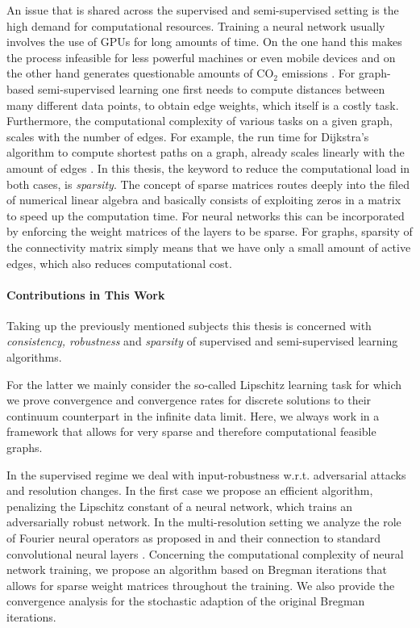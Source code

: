 An issue that is shared across the supervised and semi-supervised setting is the high demand for computational resources. Training a neural network usually involves the use of GPUs for long amounts of time. On the one hand this makes the process infeasible for less powerful machines or even mobile devices and on the other hand generates questionable amounts of $\mathrm{CO_2}$ emissions \cite{hoefler2021sparsity}. For graph-based semi-supervised learning one first needs to compute distances between many different data points, to obtain edge weights, which itself is a costly task. Furthermore, the computational complexity of various tasks on a given graph, scales with the number of edges. For example, the run time for Dijkstra's algorithm to compute shortest paths on a graph, already scales linearly with the amount of edges \cite{dijkstra2022note}. In this thesis, the keyword to reduce the computational load in both cases, is \textit{sparsity}. The concept of sparse matrices routes deeply into the filed of numerical linear algebra \cite{lanczos1952solution,golub2013matrix} and basically consists of exploiting zeros in a matrix to speed up the computation time. For neural networks this can be incorporated by enforcing the weight matrices of the layers to be sparse. For graphs, sparsity of the connectivity matrix simply means that we have only a small amount of active edges, which also reduces computational cost.
%
%
\paragraph{Contributions in This Work}
%
Taking up the previously mentioned subjects this thesis is concerned with \textit{consistency, robustness} and \textit{sparsity} of supervised and semi-supervised learning algorithms. 

For the latter we mainly consider the so-called Lipschitz learning task \cite{nadler2009statistical} for which we prove convergence and convergence rates for discrete solutions to their continuum counterpart in the infinite data limit. Here, we always work in a framework that allows for very sparse and therefore computational feasible graphs.

In the supervised regime we deal with input-robustness w.r.t. adversarial attacks and resolution changes. In the first case we propose an efficient algorithm, penalizing the Lipschitz constant \cite{lipschitz1877lehrbuch} of a neural network, which trains an adversarially robust network. In the multi-resolution setting we analyze the role of Fourier neural operators as proposed in \cite{li2020fourier} and their connection to standard convolutional neural layers \cite{fukushima1980neocognitron}. Concerning the computational complexity of neural network training, we propose an algorithm based on Bregman iterations \cite{osher2005iterative} that allows for sparse weight matrices throughout the training. We also provide the convergence analysis for the stochastic adaption of the original Bregman iterations.

